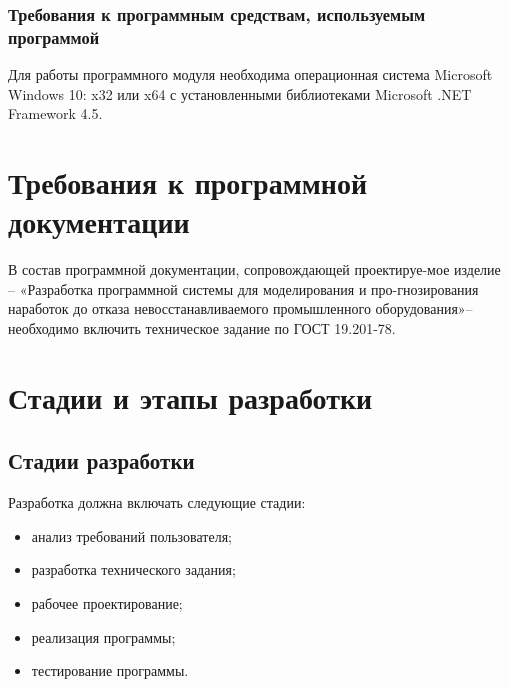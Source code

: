 \documentclass[14pt]{extarticle}        %
\begin{document}
\subsubsection {Требования к программным средствам, используемым программой}
Для работы программного модуля необходима операционная система Microsoft Windows 10: x32 или x64 с установленными библиотеками Microsoft .NET Framework 4.5.

\newpage

\section {Требования к программной документации}
В состав программной документации, сопровождающей проектируе-мое изделие – «Разработка программной системы для моделирования и про-гнозирования наработок до отказа невосстанавливаемого промышленного оборудования»– необходимо включить техническое задание по ГОСТ 19.201-78.

\newpage

\section {Стадии и этапы разработки}
\subsection {Стадии разработки}
Разработка должна включать следующие стадии: 
\begin{itemize}
    \item анализ требований пользователя; 
    \item разработка технического задания; 
    \item рабочее проектирование;
    \item реализация программы;
    \item тестирование программы.
\end{itemize}
\end{document}
